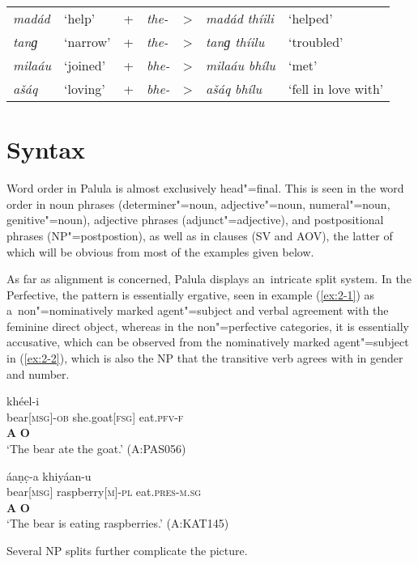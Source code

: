 \begin{table}[H]
\begin{tabularx}{\textwidth}{ l l l l l l l}
\textit{madád} &
`help' &
+ &
\textit{the-} &
{\textgreater} &
\textit{madád thíili} &
`helped'\\
\textit{tanɡ} &
`narrow' &
+ &
\textit{the-} &
{\textgreater} &
\textit{tanɡ thíilu} &
`troubled'\\
\textit{milaáu} &
`joined' &
+ &
\textit{bhe-} &
{\textgreater} &
\textit{milaáu bhílu} &
`met'\\
\textit{ašáq} &
`loving' &
+ &
\textit{bhe-} &
{\textgreater} &
\textit{ašáq bhílu} &
`fell in love with'\\
\end{tabularx}
\end{table}



\section{Syntax}
\label{sec:2-3}
Word order in Palula is almost exclusively head"=final. This is seen in the word order in noun phrases (determiner"=noun, adjective"=noun, numeral"=noun, genitive"=noun), adjective phrases (adjunct"=adjective), and postpositional phrases (NP"=postpostion), as well as in clauses (SV and AOV), the latter of which will be obvious from most of the examples given below.


As far as alignment is concerned, Palula displays an~intricate split system. In the Perfective, the pattern is essentially ergative, seen in example (\ref{ex:2-1}) as a~non"=nominatively marked agent"=subject and verbal agreement with the feminine direct object, whereas in the non"=perfective categories, it is essentially accusative, which can be observed from the nominatively marked agent"=subject in (\ref{ex:2-2}), which is also the NP that the transitive verb agrees with in gender and number.

\begin{exe}
\ex
\label{ex:2-1}
\glll [íṇc̣-a] [čhéeli] khéel-i \\
bear[\textsc{msg}]-\textsc{ob} she.goat[\textsc{fsg}] eat.\textsc{pfv-}\textsc{f}\\
\textbf{A} \textbf{O} \\
\glt `The bear ate the goat.' (A:PAS056)
\end{exe}

\begin{exe}
\ex
\label{ex:2-2}
\glll [iṇc̣] áaṇc̣-a khiyáan-u\\
bear[\textsc{msg}] raspberry[\textsc{m}]-\textsc{pl} eat.\textsc{pres-m.sg} \\
\textbf{A} \textbf{O} \\
\glt `The bear is eating raspberries.' (A:KAT145)
\end{exe} 
Several NP splits further complicate the picture.



